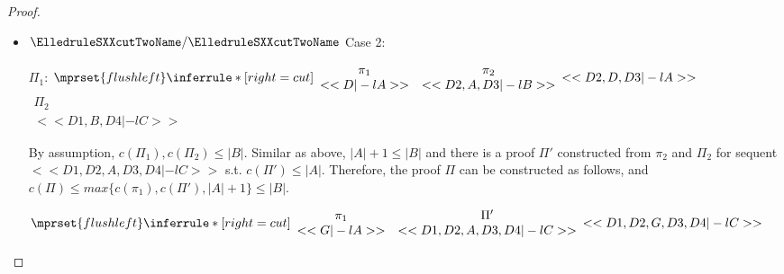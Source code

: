 \begin{proof}
\begin{enumerate}
\begin{itemize}
    \item $\ElledruleSXXcutTwoName/\ElledruleSXXcutTwoName$ Case 2:
      \begin{center}
        \scriptsize
        $\Pi_1$:
        \begin{math}
          $$\mprset{flushleft}
          \inferrule* [right={\tiny cut}] {
            {
              \begin{array}{cc}
                \pi_1 & \pi_2 \\
                {<<D |-l A>>} & {<<D2, A, D3 |-l B>>}
              \end{array}
            }
          }{<<D2, D, D3 |-l A>>}
        \end{math}
        \qquad\qquad
        \begin{math}
          \begin{array}{c}
            \Pi_2 \\
            {<<D1, B, D4 |-l C>>}
          \end{array}
        \end{math}
      \end{center}
      By assumption, $c(\Pi_1),c(\Pi_2)\leq |B|$. Similar as above, $|A|+1\leq |B|$ and there
      is a proof $\Pi'$ constructed from $\pi_2$ and $\Pi_2$ for sequent
      $<<D1, D2, A, D3, D4 |-l C>>$ s.t. $c(\Pi')\leq|A|$. Therefore, the proof $\Pi$ can be
      constructed as follows, and $c(\Pi)\leq max\{c(\pi_1),c(\Pi'),|A|+1\}\leq |B|$.
      \begin{center}
        \scriptsize
        \begin{math}
          $$\mprset{flushleft}
          \inferrule* [right={\tiny cut}] {
            {
              \begin{array}{cc}
                \pi_1 & \Pi' \\
                {<<G |-l A>>} & {<<D1, D2, A, D3, D4 |-l C>>}
              \end{array}
            }
          }{<<D1, D2, G, D3, D4 |-l C>>}
        \end{math}
      \end{center}
    
    \end{itemize}


\end{enumerate}
\end{proof}
